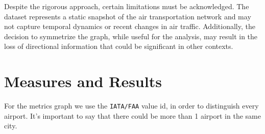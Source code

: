 \documentclass[12pt]{article}
\begin{document}
    Despite the rigorous approach, certain limitations must be acknowledged. The dataset represents a static snapshot of the air transportation network and may not capture temporal dynamics or recent changes in air traffic. Additionally, the decision to symmetrize the graph, while useful for the analysis, may result in the loss of directional information that could be significant in other contexts.

    


    \section{Measures and Results}\label{sec:measures-and-results}
    For the metrics graph we use the \texttt{IATA/FAA} value id, in order to distinguish every airport. It's important to say that there could be more than 1 airport in the same city.
\end{document}
